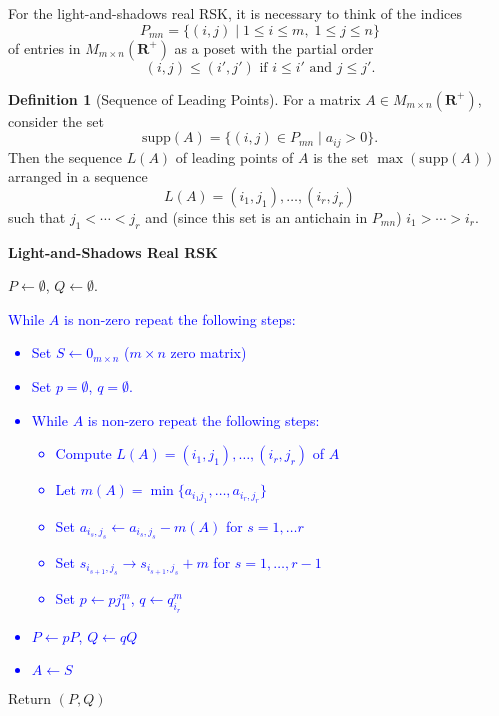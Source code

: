 \documentclass[10pt]{amsproc}
\theoremstyle{definition}
\newtheorem{definition}[theorem]{Definition}
\theoremstyle{remark}
\newcommand{\rp}{\mathbf{R}^+}
\newcommand{\ot}{\leftarrow}
\newcommand{\supp}{\mathrm{supp}}
\begin{document}
For the light-and-shadows real RSK, it is necessary to think of the indices
\begin{displaymath}
  P_{mn} = \{(i,j)\mid 1\leq i\leq m,\;1\leq j \leq n\}
\end{displaymath}
of entries in $M_{m\times n}(\rp)$ as a poset with the partial order
\begin{displaymath}
  (i,j)\leq (i',j') \text{ if } i\leq i' \text{ and } j \leq j'.
\end{displaymath}
\begin{definition}
  [Sequence of Leading Points]
  For a matrix $A\in M_{m\times n}(\rp)$, consider the set
  \begin{displaymath}
    \supp(A) = \{(i,j)\in P_{mn}\mid a_{ij}>0\}.
  \end{displaymath}
  Then the sequence $L(A)$ of leading points of $A$ is the set $\max(\supp(A))$ arranged in a sequence
  \begin{displaymath}
    L(A) = (i_1,j_1),\dotsc,(i_r,j_r)
  \end{displaymath}
  such that $j_1<\dotsb <j_r$ and (since this set is an antichain in $P_{mn}$) $i_1>\dotsb >i_r$.
\end{definition}
\begin{center}
  \textbf{Light-and-Shadows Real RSK}
\end{center}
\begin{itemize}
\item $P\ot \emptyset$, $Q\ot\emptyset$.
  \textcolor{blue}{
  \item While $A$ is non-zero repeat the following steps:
    \begin{itemize}
    \item Set $S\ot 0_{m\times n}$ ($m\times n$ zero matrix)
    \item Set $p=\emptyset$, $q=\emptyset$.
    \item While $A$ is non-zero repeat the following steps:
      \begin{itemize}
      \item Compute $L(A) = (i_1,j_1),\dotsc,(i_r,j_r)$ of $A$
      \item Let $m(A)=\min\{a_{i_1j_1},\dotsc,a_{i_r,j_r}\}$
      \item Set $a_{i_s,j_s}\ot a_{i_s,j_s}-m(A)$ for $s=1,\dotsc r$
      \item Set $s_{i_{s+1},j_s}\to s_{i_{s+1},j_s}+m$ for $s=1,\dotsc,r-1$
      \item Set $p\ot pj_1^m$, $q\ot q_{i_r}^m$
      \end{itemize}
    \item $P\ot pP$, $Q\ot qQ$
    \item $A\ot S$
    \end{itemize}
  }
\item Return $(P, Q)$
\end{itemize}
\end{document}
